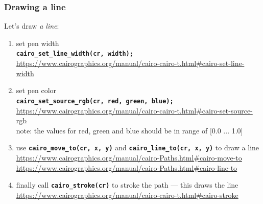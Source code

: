 \documentclass[aspectratio=169]{beamer}
\newcommand{\greenemph}[1]{\textit{\textcolor{clGreen}{#1}}}
\newcommand{\cppmethod}[1]{\texttt{\textbf{\textcolor{clCodeBlue}{#1}}}}
\begin{document}
\begin{frame}[fragile]
\frametitle{Drawing a line}
{\large Let's draw \greenemph{a line}:}
\vspace{3mm}
  \begin{enumerate}
    \item set pen width\\
    \cppmethod{cairo\_set\_line\_width(cr, width);}\\
    \vspace{-5pt}
    {\tiny \url{https://www.cairographics.org/manual/cairo-cairo-t.html#cairo-set-line-width}}

    \item set pen color\\
    \cppmethod{cairo\_set\_source\_rgb(cr, red, green, blue);}\\
    \vspace{-5pt}
    {\tiny \url{https://www.cairographics.org/manual/cairo-cairo-t.html#cairo-set-source-rgb}}\\
    {\small note: the values for red, green and blue should be in range of [0.0 ... 1.0]}

    \item use \cppmethod{cairo\_move\_to(cr, x, y)} and \cppmethod{cairo\_line\_to(cr, x, y)} to draw a line\\
    \vspace{-5pt}
    {\tiny \url{https://www.cairographics.org/manual/cairo-Paths.html#cairo-move-to}}\\
    \vspace{-5pt}
    {\tiny \url{https://www.cairographics.org/manual/cairo-Paths.html#cairo-line-to}}

    \item finally call \cppmethod{cairo\_stroke(cr)} to stroke the path --- this draws the line\\
    \vspace{-5pt}
    {\tiny \url{https://www.cairographics.org/manual/cairo-cairo-t.html#cairo-stroke}}


  \end{enumerate}
\end{frame}
\end{document}
